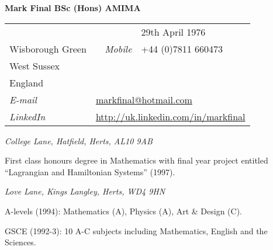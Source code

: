 \documentclass[a4paper,12pt]{article}
\newcommand{\me}{Mark Final BSc (Hons) AMIMA}
\newcommand{\largeme}{{\Large\bf\me}}
\newcommand{\cvheading}[1]{{\medskip\noindent\hspace{-5mm}{\sc #1}\par}}
\newcommand{\place}[2]{\vspace*{1ex}{\noindent\bf #1}\hfill{\it #2}\par}
\begin{document}
\largeme

\begin{tabular}{lrl}
& \hspace*{30mm}{\it Birth Date} & 29th April 1976\\
Wisborough Green & {\it Mobile} & +44 (0)7811 660473\\
West Sussex &&\\
England &&\\
{\it E-mail} & \multicolumn{2}{l}{\href{mailto:markfinal@hotmail.com}{markfinal@hotmail.com}}\\
{\it LinkedIn} & \multicolumn{2}{l}{\href{http://uk.linkedin.com/in/markfinal}{http://uk.linkedin.com/in/markfinal}}\\
\end{tabular}


\cvheading{Education}
\place{University of Hertfordshire}{College Lane, Hatfield, Herts, AL10 9AB}
First class honours degree in Mathematics with final year project entitled ``Lagrangian and Hamiltonian Systems'' (1997).

\place{Kings Langley Secondary School}{Love Lane, Kings Langley, Herts, WD4 9HN}
A-levels (1994): Mathematics (A), Physics (A), Art \& Design (C).

GSCE (1992-3): 10 A-C subjects including Mathematics, English and the Sciences.
\end{document}
